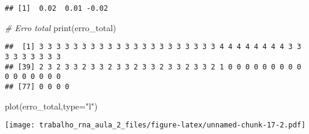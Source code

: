 \documentclass[
]{article}
\newenvironment{Shaded}{\begin{snugshade}}{\end{snugshade}}
\newcommand{\AttributeTok}[1]{\textcolor[rgb]{0.77,0.63,0.00}{#1}}
\newcommand{\CommentTok}[1]{\textcolor[rgb]{0.56,0.35,0.01}{\textit{#1}}}
\newcommand{\FunctionTok}[1]{\textcolor[rgb]{0.00,0.00,0.00}{#1}}
\newcommand{\NormalTok}[1]{#1}
\newcommand{\StringTok}[1]{\textcolor[rgb]{0.31,0.60,0.02}{#1}}
\begin{document}
\begin{verbatim}
## [1]  0.02  0.01 -0.02
\end{verbatim}

\begin{Shaded}
\begin{Highlighting}[]
\CommentTok{\# Erro total}
\FunctionTok{print}\NormalTok{(erro\_total)}
\end{Highlighting}
\end{Shaded}

\begin{verbatim}
##  [1] 3 3 3 3 3 3 3 3 3 3 3 3 3 3 3 3 3 3 3 3 3 4 4 4 4 4 4 4 4 3 3 3 3 3 3 3 3 3
## [39] 2 3 2 3 3 2 3 3 2 3 3 2 3 3 2 3 3 2 3 3 2 1 0 0 0 0 0 0 0 0 0 0 0 0 0 0 0 0
## [77] 0 0 0 0
\end{verbatim}

\begin{Shaded}
\begin{Highlighting}[]
\FunctionTok{plot}\NormalTok{(erro\_total,}\AttributeTok{type=}\StringTok{"l"}\NormalTok{)}
\end{Highlighting}
\end{Shaded}

\texttt{[image: trabalho\_rna\_aula\_2\_files/figure-latex/unnamed-chunk-17-2.pdf]}
\end{document}
